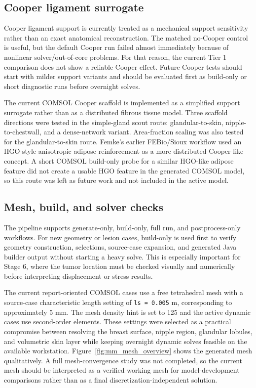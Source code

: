 \subsection{Cooper ligament surrogate}

Cooper ligament support is currently treated as a mechanical support sensitivity rather than an exact anatomical reconstruction. The matched no-Cooper control is useful, but the default Cooper run failed almost immediately because of nonlinear solver/out-of-core problems. For that reason, the current Tier 1 comparison does not show a reliable Cooper effect. Future Cooper tests should start with milder support variants and should be evaluated first as build-only or short diagnostic runs before overnight solves.

The current COMSOL Cooper scaffold is implemented as a simplified support surrogate rather than as a distributed fibrous tissue model. Three scaffold directions were tested in the simple-gland scout route: glandular-to-skin, nipple-to-chestwall, and a dense-network variant. Area-fraction scaling was also tested for the glandular-to-skin route. Femke's earlier FEBio/Sioux workflow used an HGO-style anisotropic adipose reinforcement as a more distributed Cooper-like concept. A short COMSOL build-only probe for a similar HGO-like adipose feature did not create a usable HGO feature in the generated COMSOL model, so this route was left as future work and not included in the active model.

\subsection{Mesh, build, and solver checks}

The pipeline supports generate-only, build-only, full run, and postprocess-only workflows. For new geometry or lesion cases, build-only is used first to verify geometry construction, selections, source-case expansion, and generated Java builder output without starting a heavy solve. This is especially important for Stage 6, where the tumor location must be checked visually and numerically before interpreting displacement or stress results.

The current report-oriented COMSOL cases use a free tetrahedral mesh with a source-case characteristic length setting of \texttt{ls = 0.005} m, corresponding to approximately 5 mm. The mesh density hint is set to 125 and the active dynamic cases use second-order elements. These settings were selected as a practical compromise between resolving the breast surface, nipple region, glandular lobules, and volumetric skin layer while keeping overnight dynamic solves feasible on the available workstation. Figure~\ref{fig:mm_mesh_overview} shows the generated mesh qualitatively. A full mesh-convergence study was not completed, so the current mesh should be interpreted as a verified working mesh for model-development comparisons rather than as a final discretization-independent solution.

